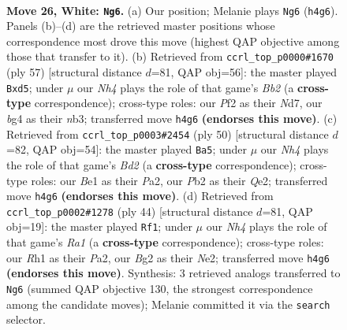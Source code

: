 \documentclass[11pt]{article}
\begin{document}
\clearpage

\begin{figure}[p]\centering
\begin{subfigure}{0.46\textwidth}\centering
\resizebox{\linewidth}{!}{%
\newchessgame
\chessboard[
  setfen={4k2r/4q3/8/2pp1p2/3n2bN/1p6/1P1QPPB1/K3B2R w k - 0 26},
  showmover=false,
  pgfstyle=straightmove, color=movearrow, markmove={h4-g6}
]}
\caption{}
\end{subfigure}\hfill
\begin{subfigure}{0.46\textwidth}\centering
\resizebox{\linewidth}{!}{%
\newchessgame
\chessboard[
  setfen={q4bk1/1b1n2p1/3p3p/3P4/1Q2N3/PN5P/1B3PP1/6K1 b - - 0 29},
  showmover=false,
  pgfstyle=straightmove, color=movearrow, markmove={b7-d5}
]}
\caption{}
\end{subfigure}
\\[4pt]
\begin{subfigure}{0.46\textwidth}\centering
\resizebox{\linewidth}{!}{%
\newchessgame
\chessboard[
  setfen={3r2k1/5pp1/p5b1/7p/3q2nP/5BP1/P2BQP2/2R3K1 w - - 0 26},
  showmover=false,
  pgfstyle=straightmove, color=movearrow, markmove={d2-a5}
]}
\caption{}
\end{subfigure}\hfill
\begin{subfigure}{0.46\textwidth}\centering
\resizebox{\linewidth}{!}{%
\newchessgame
\chessboard[
  setfen={r4k2/pp1b1pq1/2n4p/3p4/8/3BQ2P/PP2N1P1/R6K w - - 1 23},
  showmover=false,
  pgfstyle=straightmove, color=movearrow, markmove={a1-f1}
]}
\caption{}
\end{subfigure}
\caption{\textbf{Move 26, White: \texttt{Ng6}.} (a) Our position; Melanie plays \texttt{Ng6} (\texttt{h4g6}). Panels (b)--(d) are the retrieved master positions whose correspondence most drove this move (highest QAP objective among those that transfer to it). (b) Retrieved from \texttt{ccrl\_top\_p0000\#1670} (ply 57) [structural distance $d$=81, QAP obj=56]: the master played \texttt{Bxd5}; under $\mu$ our \emph{Nh4} plays the role of that game's \emph{Bb2} (a \textbf{cross-type} correspondence); cross-type roles: our \emph{P}f2 as their \emph{N}d7, our \emph{b}g4 as their \emph{n}b3; transferred move \texttt{h4g6} \textbf{(endorses this move)}. (c) Retrieved from \texttt{ccrl\_top\_p0003\#2454} (ply 50) [structural distance $d$=82, QAP obj=54]: the master played \texttt{Ba5}; under $\mu$ our \emph{Nh4} plays the role of that game's \emph{Bd2} (a \textbf{cross-type} correspondence); cross-type roles: our \emph{B}e1 as their \emph{P}a2, our \emph{P}b2 as their \emph{Q}e2; transferred move \texttt{h4g6} \textbf{(endorses this move)}. (d) Retrieved from \texttt{ccrl\_top\_p0002\#1278} (ply 44) [structural distance $d$=81, QAP obj=19]: the master played \texttt{Rf1}; under $\mu$ our \emph{Nh4} plays the role of that game's \emph{Ra1} (a \textbf{cross-type} correspondence); cross-type roles: our \emph{R}h1 as their \emph{P}a2, our \emph{B}g2 as their \emph{N}e2; transferred move \texttt{h4g6} \textbf{(endorses this move)}. Synthesis: 3 retrieved analogs transferred to \texttt{Ng6} (summed QAP objective 130, the strongest correspondence among the candidate moves); Melanie committed it via the \texttt{search} selector.}
\label{fig:thought-m50}
\end{figure}
\end{document}
